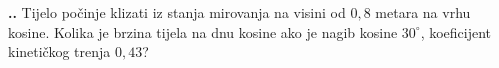 
\noindent 
\textbf{
\thecjelina.\thezadatak.}
Tijelo počinje klizati iz stanja mirovanja na visini od $0,8$ metara na vrhu kosine. Kolika je brzina tijela na dnu kosine ako je nagib kosine $30^\circ$,
koeficijent kinetičkog trenja $0,43$?

